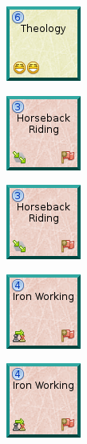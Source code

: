 \documentclass{article}
\begin{document}
\begin{figure}
  \begin{subfigure}{}
    \includegraphics[scale=1]{../rules/png/doe_tech_theology.png}
  \end{subfigure}
  \begin{subfigure}{}
    \includegraphics[scale=1]{../rules/png/doe_tech_horseback_riding.png}
  \end{subfigure}
  \begin{subfigure}{}
    \includegraphics[scale=1]{../rules/png/doe_tech_horseback_riding.png}
  \end{subfigure}
  \begin{subfigure}{}
    \includegraphics[scale=1]{../rules/png/doe_tech_iron_working.png}
  \end{subfigure}
  \begin{subfigure}{}
    \includegraphics[scale=1]{../rules/png/doe_tech_iron_working.png}
  \end{subfigure}
\end{figure}
\end{document}
